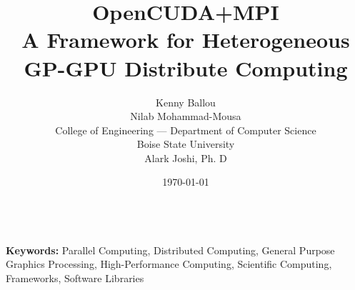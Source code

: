 \documentclass[a4paper,11pt]{article}
\title{OpenCUDA+MPI\\
       A Framework for Heterogeneous GP-GPU Distribute Computing}
\date{\today}
\author{Kenny Ballou\\
        Nilab Mohammad-Mousa\\
        College of Engineering --- Department of Computer Science\\
        Boise State University\\
        Alark Joshi, Ph. D}
\begin{document}


\nocite{*}
\thispagestyle{fancy}
\\
\textbf{Keywords:} Parallel Computing, Distributed Computing, General Purpose
Graphics Processing, High-Performance Computing, Scientific Computing,
Frameworks, Software Libraries





%
\appendix
%

\printglossaries{}
\end{document}
